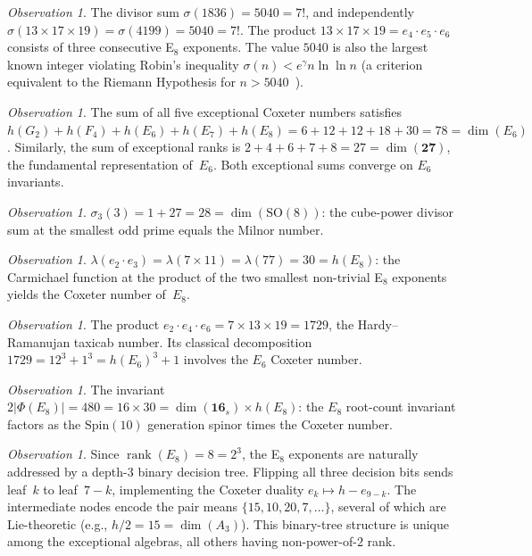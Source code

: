 \documentclass[11pt]{amsart}
\theoremstyle{plain}
\theoremstyle{definition}
\theoremstyle{remark}
\newtheorem{observation}[theorem]{Observation}
\renewcommand{\Phi}{\varPhi}
\newcommand{\rank}{\operatorname{rank}}
\begin{document}
\begin{observation}\label{obs:sigma-mass}
The divisor sum $\sigma(1836) = 5040 = 7!$, and independently
$\sigma(13 \times 17 \times 19) = \sigma(4199) = 5040 = 7!$.
The product $13 \times 17 \times 19 = e_4 \cdot e_5 \cdot e_6$
consists of three consecutive E$_8$ exponents.
The value $5040$ is also the largest known integer violating Robin's
inequality $\sigma(n) < e^\gamma n \ln\ln n$ (a criterion equivalent
to the Riemann Hypothesis for $n > 5040$~\cite{Robin1984}).
\end{observation}

\begin{observation}\label{obs:coxeter-sum}
The sum of all five exceptional Coxeter numbers satisfies
$h(G_2) + h(F_4) + h(E_6) + h(E_7) + h(E_8)
= 6 + 12 + 12 + 18 + 30 = 78 = \dim(E_6)$.
Similarly, the sum of exceptional ranks is
$2 + 4 + 6 + 7 + 8 = 27 = \dim(\mathbf{27})$,
the fundamental representation of~$E_6$.
Both exceptional sums converge on $E_6$ invariants.
\end{observation}

\begin{observation}\label{obs:digit-sum}
$\sigma_3(3) = 1 + 27 = 28 = \dim(\mathrm{SO}(8))$: the cube-power
divisor sum at the smallest odd prime equals the Milnor number.
\end{observation}

\begin{observation}\label{obs:lambda-77}
$\lambda(e_2 \cdot e_3) = \lambda(7 \times 11) = \lambda(77) = 30 = h(E_8)$:
the Carmichael function at the product of the two smallest non-trivial
E$_8$ exponents yields the Coxeter number of~$E_8$.
\end{observation}

\begin{observation}\label{obs:ramanujan-1729}
The product $e_2 \cdot e_4 \cdot e_6 = 7 \times 13 \times 19 = 1729$,
the Hardy--Ramanujan taxicab number.  Its classical decomposition
$1729 = 12^3 + 1^3 = h(E_6)^3 + 1$ involves the $E_6$ Coxeter number.
\end{observation}

\begin{observation}\label{obs:480-factorization}
The invariant $2|\Phi(E_8)| = 480 = 16 \times 30
= \dim(\mathbf{16}_s) \times h(E_8)$:
the $E_8$ root-count invariant factors as the $\mathrm{Spin}(10)$
generation spinor times the Coxeter number.
\end{observation}

\begin{observation}\label{obs:binary-tree}
Since $\rank(E_8) = 8 = 2^3$, the E$_8$ exponents are naturally
addressed by a depth-$3$ binary decision tree.  Flipping all three
decision bits sends leaf~$k$ to leaf~$7-k$, implementing the Coxeter
duality $e_k \mapsto h - e_{9-k}$.  The intermediate nodes encode
the pair means $\{15, 10, 20, 7, \ldots\}$, several of which are
Lie-theoretic (e.g., $h/2 = 15 = \dim(A_3)$).  This binary-tree
structure is unique among the exceptional algebras, all others
having non-power-of-$2$ rank.
\end{observation}
\end{document}
